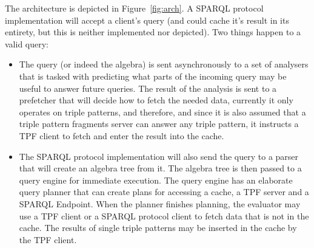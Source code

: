 The architecture is depicted in Figure~\ref{fig:arch}. A SPARQL
protocol implementation will accept a client's query (and could cache
it's result in its entirety, but this is neither implemented nor
depicted). Two things happen to a valid query:

\begin{itemize}
\item The query (or indeed the algebra) is sent asynchronously to a
  set of analysers that is tasked with predicting what parts of the
  incoming query may be useful to answer future queries. The result of
  the analysis is sent to a prefetcher that will decide how to fetch
  the needed data, currently it only operates on triple patterns, and
  therefore, and since it is also assumed that a triple pattern
  fragments server can answer any triple pattern, it instructs a TPF
  client to fetch and enter the result into the cache.  
\item The SPARQL protocol implementation will also send the query to
  a parser that will create an algebra tree from it. The algebra tree
  is then passed to a query engine for immediate execution. The query
  engine has an elaborate query planner that can create plans for
  accessing a cache, a TPF server and a SPARQL Endpoint. When the
  planner finishes planning, the evaluator may use a TPF client or a
  SPARQL protocol client to fetch data that is not in the cache. The
  results of single triple patterns may be inserted in the cache by
  the TPF client.
\end{itemize}

